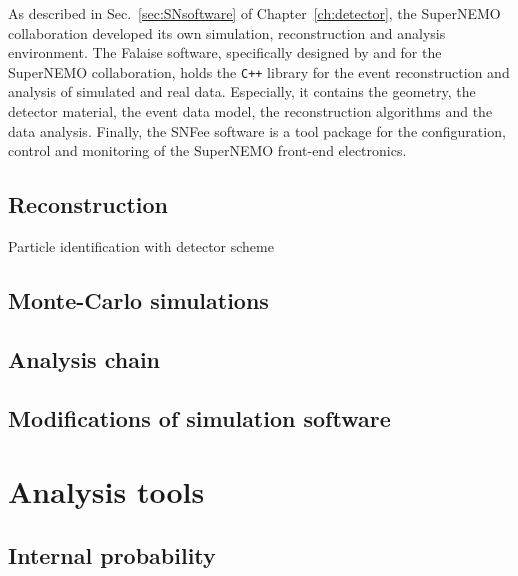 As described in Sec.~\ref{sec:SNsoftware} of Chapter~\ref{ch:detector}, the SuperNEMO collaboration developed its own simulation, reconstruction and analysis environment.
The Falaise software, specifically designed by and for the SuperNEMO collaboration, holds the \verb!C++! library for the event reconstruction and analysis of simulated and real data.
Especially, it contains the geometry, the detector material, the event data model, the reconstruction algorithms and the data analysis.
Finally, the SNFee software is a tool package for the configuration, control and monitoring of the SuperNEMO front-end electronics.

\subsection{Reconstruction}

Particle identification with detector scheme

\subsection{Monte-Carlo simulations}

\subsection{Analysis chain}


\subsection{Modifications of simulation software}



\section{Analysis tools}

\subsection{Internal probability}
\label{subsec:internal_prob}

